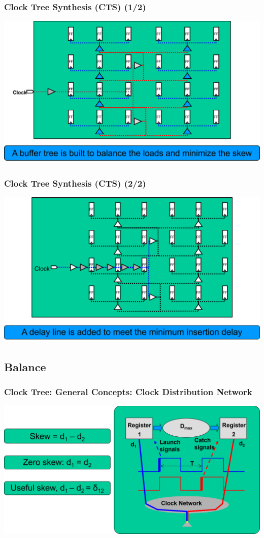 \documentclass[compress]{beamer}
\begin{document}
\begin{frame}
	\frametitle{Clock Tree Synthesis (CTS) (1/2)}
		\begin{center}
			\includegraphics[width=\textwidth]{CTS2}
		\end{center}
\end{frame}
\begin{frame}
	\frametitle{Clock Tree Synthesis (CTS) (2/2)}
	\begin{center}
		\includegraphics[width=\textwidth]{CTS3}
	\end{center}
\end{frame}
\subsection[Balance]{Balance}
\begin{frame}
	\frametitle{Clock Tree: General Concepts: Clock Distribution Network}
	\begin{center}
		\includegraphics[width=\textwidth]{CTS4}
	\end{center}

\end{frame}
\end{document}
